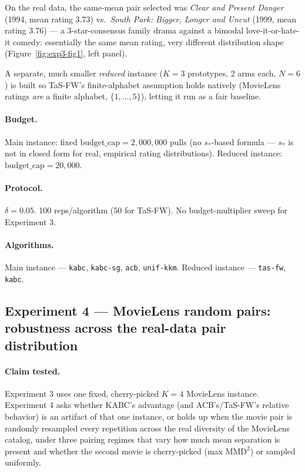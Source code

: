 \documentclass[11pt]{article}
\begin{document}
On the real data, the same-mean pair selected was \emph{Clear and Present Danger}
(1994, mean rating 3.73) vs.\ \emph{South Park: Bigger, Longer and Uncut} (1999,
mean rating 3.76) --- a 3-star-consensus family drama against a bimodal
love-it-or-hate-it comedy: essentially the same mean rating, very different
distribution shape (Figure~\ref{fig:exp3-fig1}, left panel).

A separate, much smaller \emph{reduced} instance ($K=3$ prototypes, 2 arms each,
$N=6$) is built so TaS-FW's finite-alphabet assumption holds natively (MovieLens
ratings \emph{are} a finite alphabet, $\{1,\ldots,5\}$), letting it run as a fair
baseline.

\paragraph{Budget.} Main instance: fixed $\text{budget\_cap}=2{,}000{,}000$ pulls (no
$s_*$-based formula --- $s_*$ is not in closed form for real, empirical rating
distributions). Reduced instance: $\text{budget\_cap}=20{,}000$.

\paragraph{Protocol.} $\delta=0.05$. 100 reps/algorithm (50 for TaS-FW). No
budget-multiplier sweep for Experiment 3.

\paragraph{Algorithms.} Main instance --- \texttt{kabc}, \texttt{kabc-sg},
\texttt{acb}, \texttt{unif-kkm}. Reduced instance --- \texttt{tas-fw}, \texttt{kabc}.

\subsection{Experiment 4 --- MovieLens random pairs: robustness across the real-data pair distribution}

\paragraph{Claim tested.} Experiment 3 uses one fixed, cherry-picked $K=4$
MovieLens instance. Experiment 4 asks whether KABC's advantage (and
ACB's/TaS-FW's relative behavior) is an artifact of that one instance, or
holds up when the movie pair is randomly resampled every repetition across
the real diversity of the MovieLens catalog, under three pairing regimes
that vary how much mean separation is present and whether the second movie
is cherry-picked (max $\mathrm{MMD}^2$) or sampled uniformly.
\end{document}
